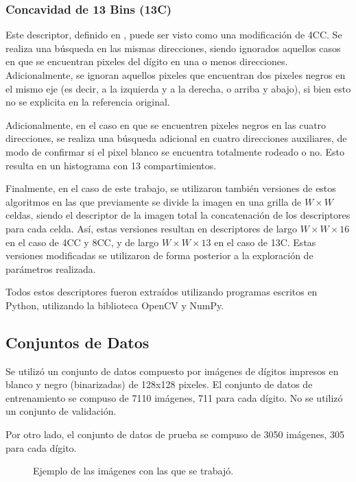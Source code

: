 \documentclass[12pt]{article}
\begin{document}
\subsubsection{Concavidad de 13 Bins (13C)}

Este descriptor, definido en \cite{bins}, puede ser visto como una modificación
de 4CC. Se realiza una búsqueda en las mismas direcciones, siendo ignorados
aquellos casos en que se encuentran pixeles del dígito en una o menos
direcciones. Adicionalmente, se ignoran aquellos pixeles que encuentran dos
pixeles negros en el mismo eje (es decir, a la izquierda y a la derecha, o
arriba y abajo), si bien esto no se explicita en la referencia original. 

Adicionalmente, en el caso en que se encuentren pixeles negros en las cuatro
direcciones, se realiza una búsqueda adicional en cuatro direcciones auxiliares,
de modo de confirmar si el pixel blanco se encuentra totalmente rodeado o no.
Esto resulta en un histograma con 13 compartimientos.

Finalmente, en el caso de este trabajo, se utilizaron también versiones de estos
algoritmos en las que previamente se divide la imagen en una grilla de $W \times
W$ celdas, siendo el descriptor de la imagen total la concatenación de los
descriptores para cada celda. Así, estas versiones resultan en descriptores de
largo $W \times W \times 16$ en el caso de 4CC y 8CC, y de largo $W \times W
\times 13$ en el caso de 13C. Estas versiones modificadas se utilizaron de forma
posterior a la exploración de parámetros realizada.

Todos estos descriptores fueron extraídos utilizando programas escritos en
Python, utilizando la biblioteca OpenCV y NumPy.

\subsection{Conjuntos de Datos}

Se utilizó un conjunto de datos compuesto por imágenes de dígitos impresos en
blanco y negro (binarizadas) de 128x128 pixeles. El conjunto de datos de
entrenamiento se compuso de 7110 imágenes, 711 para cada dígito. No se utilizó
un conjunto de validación.

Por otro lado, el conjunto de datos de prueba se compuso de 3050 imágenes, 305
para cada dígito. 

\begin{figure}[h]
    \centering
\caption{Ejemplo de las imágenes con las que se trabajó.}
\end{figure}
\end{document}
